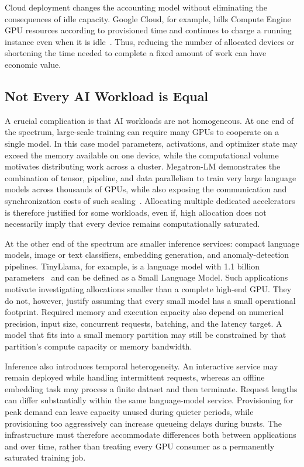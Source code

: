 Cloud deployment changes the accounting model without eliminating the consequences of idle capacity. Google Cloud, for example, bills Compute Engine GPU resources according to provisioned time and continues to charge a running instance even when it is idle~\cite{google2026computepricing}. Thus, reducing the number of allocated devices or shortening the time needed to complete a fixed amount of work can have economic value.

\subsection{Not Every AI Workload is Equal}
\label{subsec:workloads-equality}
A crucial complication is that AI workloads are not homogeneous. At one end of the spectrum, large-scale training can require many GPUs to cooperate on a single model. In this case model parameters, activations, and optimizer state may exceed the memory available on one device, while the computational volume motivates distributing work across a cluster. Megatron-LM demonstrates the combination of tensor, pipeline, and data parallelism to train very large language models across thousands of GPUs, while also exposing the communication and synchronization costs of such scaling~\cite{narayanan2021megatron}. Allocating multiple dedicated accelerators is therefore justified for some workloads, even if, high allocation does not necessarily imply that every device remains computationally saturated.

At the other end of the spectrum are smaller inference services: compact language models, image or text classifiers, embedding generation, and anomaly-detection pipelines. TinyLlama, for example, is a language model with 1.1 billion parameters~\cite{zhang2024tinyllama} and can be defined as a Small Language Model. Such applications motivate investigating allocations smaller than a complete high-end GPU. They do not, however, justify assuming that every small model has a small operational footprint. Required memory and execution capacity also depend on numerical precision, input size, concurrent requests, batching, and the latency target. A model that fits into a small memory partition may still be constrained by that partition's compute capacity or memory bandwidth.

Inference also introduces temporal heterogeneity. An interactive service may remain deployed while handling intermittent requests, whereas an offline embedding task may process a finite dataset and then terminate. Request lengths can differ substantially within the same language-model service. Provisioning for peak demand can leave capacity unused during quieter periods, while provisioning too aggressively can increase queueing delays during bursts. The infrastructure must therefore accommodate differences both between applications and over time, rather than treating every GPU consumer as a permanently saturated training job.

